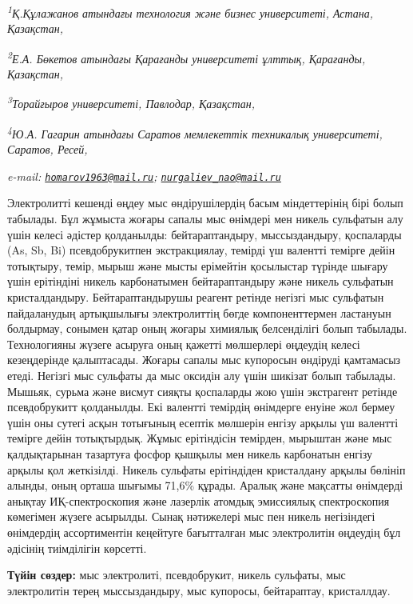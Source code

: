 \begin{affiliation}
\emph{\textsuperscript{1}Қ.Құлажанов атындағы технология және бизнес университеті, Астана, Қазақстан,}

\emph{\textsuperscript{2}Е.А. Бөкетов атындағы Қарағанды университеті ұлттық, Қарағанды, Қазақстан,}

\emph{\textsuperscript{3}Торайғыров университеті, Павлодар, Қазақстан,}

\emph{\textsuperscript{4}Ю.А. Гагарин атындағы Саратов мемлекеттік техникалық университеті, Саратов, Ресей,}

\emph{e-mail: \href{mailto:homarov1963@mail.ru}{\nolinkurl{homarov1963@mail.ru}}; \href{mailto:nurgaliev_nao@mail.ru}{\nolinkurl{nurgaliev\_nao@mail.ru}}}
\end{affiliation}

Электролитті кешенді өңдеу мыс өндірушілердің басым міндеттерінің бірі
болып табылады. Бұл жұмыста жоғары сапалы мыс өнімдері мен никель
сульфатын алу үшін келесі әдістер қолданылды: бейтараптандыру,
мыссыздандыру, қоспаларды (As, Sb, Bi) псевдобрукитпен экстракциялау,
темірді үш валентті темірге дейін тотықтыру, темір, мырыш және мысты
ерімейтін қосылыстар түрінде шығару үшін ерітіндіні никель карбонатымен
бейтараптандыру және никель сульфатын кристалдандыру. Бейтараптандырушы
реагент ретінде негізгі мыс сульфатын пайдаланудың артықшылығы
электролиттің бөгде компоненттермен ластануын болдырмау, сонымен қатар
оның жоғары химиялық белсенділігі болып табылады. Технологияны жүзеге
асыруға оның қажетті мөлшерлері өңдеудің келесі кезеңдерінде
қалыптасады. Жоғары сапалы мыс купоросын өндіруді қамтамасыз етеді.
Негізгі мыс сульфаты да мыс оксидін алу үшін шикізат болып табылады.
Мышьяк, сурьма және висмут сияқты қоспаларды жою үшін экстрагент ретінде
псевдобрукитт қолданылды. Екі валентті темірдің өнімдерге енуіне жол
бермеу үшін оны сутегі асқын тотығының есептік мөлшерін енгізу арқылы үш
валентті темірге дейін тотықтырдық. Жұмыс ерітіндісін темірден, мырыштан
және мыс қалдықтарынан тазартуға фосфор қышқылы мен никель карбонатын
енгізу арқылы қол жеткізілді. Никель сульфаты ерітіндіден кристалдану
арқылы бөлініп алынды, оның орташа шығымы 71,6\% құрады. Аралық және
мақсатты өнімдерді анықтау ИҚ-спектроскопия және лазерлік атомдық
эмиссиялық спектроскопия көмегімен жүзеге асырылды. Сынақ нәтижелері мыс
пен никель негізіндегі өнімдердің ассортиментін кеңейтуге бағытталған
мыс электролитін өңдеудің бұл әдісінің тиімділігін көрсетті.

{\bfseries Түйін сөздер:} мыс электролиті, псевдобрукит, никель сульфаты,
мыс электролитін терең мыссыздандыру, мыс купоросы, бейтараптау,
кристаллдау.

